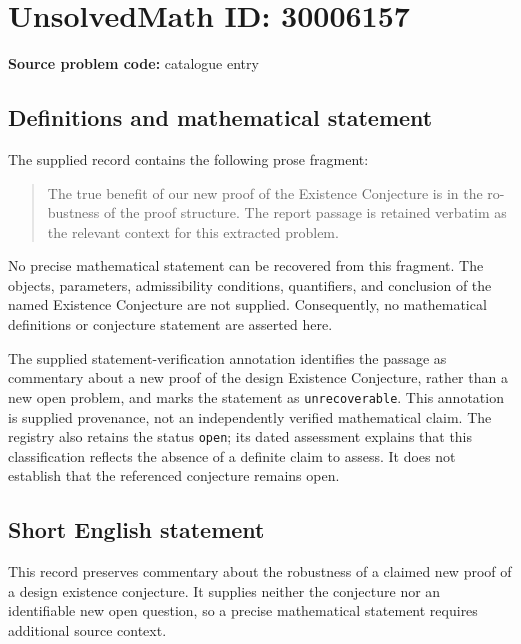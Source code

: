 \documentclass[11pt]{article}
\begin{document}
\section*{UnsolvedMath ID: 30006157}
\textbf{Source problem code:} catalogue entry
\subsection{Definitions and mathematical statement}
The supplied record contains the following prose fragment:
\begin{quote}
The true beneﬁt of our new proof of the Existence Conjecture is in the ro- bustness of the proof structure. The report passage is retained verbatim as the relevant context for this extracted problem.
\end{quote}
No precise mathematical statement can be recovered from this fragment. The objects, parameters, admissibility conditions, quantifiers, and conclusion of the named Existence Conjecture are not supplied. Consequently, no mathematical definitions or conjecture statement are asserted here.

The supplied statement-verification annotation identifies the passage as commentary about a new proof of the design Existence Conjecture, rather than a new open problem, and marks the statement as \texttt{unrecoverable}. This annotation is supplied provenance, not an independently verified mathematical claim. The registry also retains the status \texttt{open}; its dated assessment explains that this classification reflects the absence of a definite claim to assess. It does not establish that the referenced conjecture remains open.
\subsection{Short English statement}
This record preserves commentary about the robustness of a claimed new proof of a design existence conjecture. It supplies neither the conjecture nor an identifiable new open question, so a precise mathematical statement requires additional source context.
\end{document}
